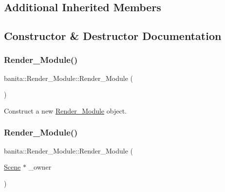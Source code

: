 \subsection*{Additional Inherited Members}


\subsection{Constructor \& Destructor Documentation}
\mbox{\label{classbanita_1_1_render___module_ac1d3202b1acb7b04b6bab43b6d154417}} 
\subsubsection{\texorpdfstring{Render\_Module()}{Render\_Module()}\hspace{0.1cm}{\footnotesize\ttfamily [1/2]}}
{\footnotesize\ttfamily banita\+::\+Render\+\_\+\+Module\+::\+Render\+\_\+\+Module (\begin{DoxyParamCaption}{ }\end{DoxyParamCaption})}



Construct a new \mbox{\hyperlink{classbanita_1_1_render___module}{Render\+\_\+\+Module}} object. 

\mbox{\label{classbanita_1_1_render___module_a3e74fda921261303b79e9f439080bf9d}} 
\subsubsection{\texorpdfstring{Render\_Module()}{Render\_Module()}\hspace{0.1cm}{\footnotesize\ttfamily [2/2]}}
{\footnotesize\ttfamily banita\+::\+Render\+\_\+\+Module\+::\+Render\+\_\+\+Module (\begin{DoxyParamCaption}\item[{\mbox{\hyperlink{classbanita_1_1_scene}{Scene}} $\ast$}]{\+\_\+owner }\end{DoxyParamCaption})}



